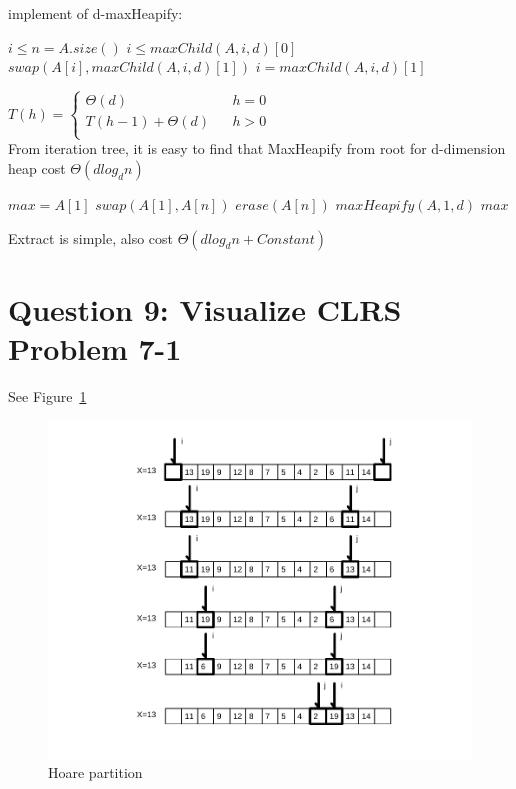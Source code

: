\documentclass[]{article}
\begin{document}
implement of d-maxHeapify:\\
\begin{codebox}
	
	\li \While $i \le n = A.size()$
	\li \Do	\If $i \le maxChild(A,i,d)[0]$
	\li 		\Then $swap(A[i], maxChild(A,i,d)[1])$
	\li 		  	$i = maxChild(A,i,d)[1]$
	\End
	\End
	\li \Return
\end{codebox}

$ T(h)=\left\{
\begin{array}{lcl}
\Theta(d)       &      & {h = 0}\\
T(h-1) + \Theta(d)     &      & {h > 0}\\
\end{array} \right. $\\

From iteration tree, it is easy to find that MaxHeapify from root for d-dimension heap cost $\Theta(dlog_{d}n)$
	
\begin{codebox}
	
	\li $max = A[1]$
	\li $swap(A[1], A[n])$
	\li $erase(A[n])$
	\li $maxHeapify(A, 1, d)$
	\li \Return $max$\\
\end{codebox}

Extract is simple, also cost  $\Theta(dlog_{d}n + Constant)$

\section{Question 9: Visualize CLRS Problem 7-1}

See Figure~\ref{fig:2hp}

\begin{figure}
	\centering
	\includegraphics[width=0.9\linewidth]{2_hpar}
	\caption{Hoare partition}
	\label{fig:2hp}
\end{figure}
\end{document}
